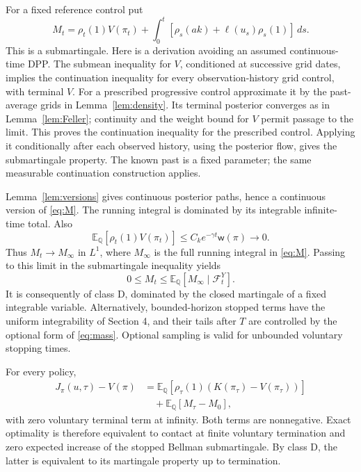 \documentclass[11pt,a4paper]{article}
\theoremstyle{definition}
\theoremstyle{remark}
\newcommand{\E}{\mathbb E}
\newcommand{\Qq}{\mathbb Q}
\newcommand{\wt}{\mathsf w}
\begin{document}
For a fixed reference control put
\begin{equation}\label{eq:M}
 M_t=\rho_t(1)V(\pi_t)+
          \int_0^t[\rho_s(ak)+\ell(u_s)\rho_s(1)]\,ds.
\end{equation}
This is a submartingale. Here is a derivation avoiding an assumed
continuous-time DPP. The submean inequality for \(V\), conditioned
at successive grid dates, implies the continuation inequality for
every observation-history grid control, with terminal \(V\).
For a prescribed progressive control approximate it by the
past-average grids in Lemma~\ref{lem:density}. Its terminal posterior
converges as in Lemma~\ref{lem:Feller}; continuity and the weight
bound for \(V\) permit passage to the limit. This proves the
continuation inequality for the prescribed control. Applying it
conditionally after each observed history, using the posterior flow,
gives the submartingale property. The known past is a fixed parameter;
the same measurable continuation construction applies.

Lemma~\ref{lem:versions} gives continuous posterior paths, hence a
continuous version of \eqref{eq:M}. The running integral is dominated
by its integrable infinite-time total. Also
\[
 \E_\Qq[\rho_t(1)V(\pi_t)]
       \leq C_ke^{-\gamma t}\wt(\pi)\longrightarrow0.
\]
Thus \(M_t\to M_\infty\) in \(L^1\), where \(M_\infty\) is the full
running integral in \eqref{eq:M}. Passing to this limit in the
submartingale inequality yields
\[
 0\leq M_t\leq\E_\Qq[M_\infty\mid\mathcal F_t^Y].
\]
It is consequently of class D, dominated by the closed martingale
of a fixed integrable variable. Alternatively, bounded-horizon
stopped terms have the uniform integrability of Section 4, and
their tails after \(T\) are controlled by the optional form of
\eqref{eq:mass}. Optional sampling is valid for unbounded voluntary
stopping times.

For every policy,
\begin{equation}\label{eq:certificate}
 \begin{split}
 J_\pi(u,\tau)-V(\pi)
  &=\E_\Qq[\rho_\tau(1)(K(\pi_\tau)-V(\pi_\tau))]\\
  &\quad+\E_\Qq[M_\tau-M_0],
 \end{split}
\end{equation}
with zero voluntary terminal term at infinity.
Both terms are nonnegative. Exact optimality is therefore equivalent
to contact at finite voluntary termination and zero expected
increase of the stopped Bellman submartingale. By class D, the
latter is equivalent to its martingale property up to termination.
\end{document}
